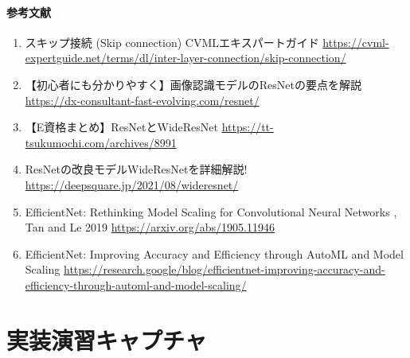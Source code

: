 \documentclass{ltjsarticle}
\begin{document}
\paragraph{参考文献}
\begin{enumerate}
  \item スキップ接続 (Skip connection)  CVMLエキスパートガイド \url{https://cvml-expertguide.net/terms/dl/inter-layer-connection/skip-connection/}
  \item 【初心者にも分かりやすく】画像認識モデルのResNetの要点を解説 \url{https://dx-consultant-fast-evolving.com/resnet/}
  \item 【E資格まとめ】ResNetとWideResNet \url{https://tt-tsukumochi.com/archives/8991}
  \item  ResNetの改良モデルWideResNetを詳細解説! \url{https://deepsquare.jp/2021/08/wideresnet/}
  \item EfficientNet: Rethinking Model Scaling for Convolutional Neural Networks , Tan and Le 2019 \url{https://arxiv.org/abs/1905.11946}
  \item EfficientNet: Improving Accuracy and Efficiency through AutoML and Model Scaling  \url{https://research.google/blog/efficientnet-improving-accuracy-and-efficiency-through-automl-and-model-scaling/}
\end{enumerate}

\clearpage
\section{実装演習キャプチャ}
\end{document}

